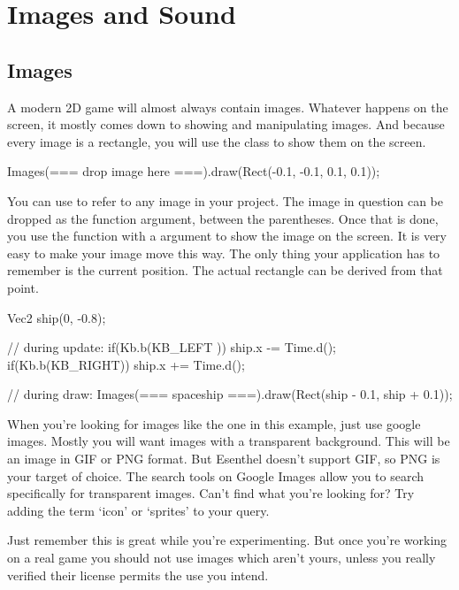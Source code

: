 \chapter{Images and Sound}
\section{Images}
A modern 2D game will almost always contain images. Whatever happens on the screen, it mostly comes down to showing and manipulating images. And because every image is a rectangle, you will use the  class to show them on the screen.

\begin{code}
Images(=== drop image here ===).draw(Rect(-0.1, -0.1, 0.1, 0.1));
\end{code}

You can use  to refer to any image in your project. The image in question can be dropped as the function argument, between the parentheses. Once that is done, you use the function  with a  argument to show the image on the screen. It is very easy to make your image move this way. The only thing your application has to remember is the current position. The actual rectangle can be derived from that point.

\begin{code}
Vec2 ship(0, -0.8);

// during update:
if(Kb.b(KB_LEFT )) ship.x -= Time.d();
if(Kb.b(KB_RIGHT)) ship.x += Time.d();

// during draw:
Images(=== spaceship ===).draw(Rect(ship - 0.1,  ship + 0.1));
\end{code}

\begin{note}
When you're looking for images like the one in this example, just use google images. Mostly you will want images with a transparent background. This will be an image in GIF or PNG format. But Esenthel doesn't support GIF, so PNG is your target of choice. The search tools on Google Images allow you to search specifically for transparent images. Can't find what you're looking for? Try adding the term `icon' or `sprites' to your query.

Just remember this is great while you're experimenting. But once you're working on a real game you should not use images which aren't yours, unless you really verified their license permits the use you intend.
\end{note}

